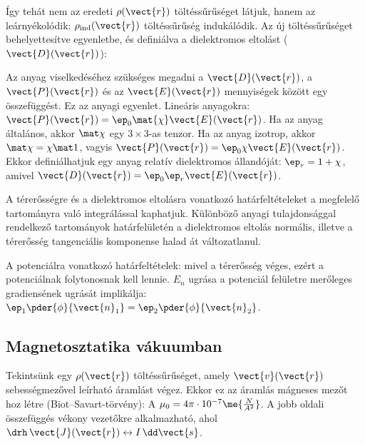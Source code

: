    Így tehát nem az eredeti $\rho(\vect{r})$ töltéssűrűséget látjuk, hanem az leárnyékolódik: 
   $\rho_\text{ind}(\vect{r})$ töltéssűrűség indukálódik. 
   Az új töltéssűrűséget behelyettesítve  egyenletbe, és definiálva a dielektromos eltolást ($\vect{D}(\vect{r})$):
   
   Az anyag viselkedéséhez szükséges megadni a $\vect{D}(\vect{r})$, a $\vect{P}(\vect{r})$ és az $\vect{E}(\vect{r})$ mennyiségek között egy összefüggést.
   Ez az anyagi egyenlet.
   Lineáris anyagokra: $\vect{P}(\vect{r})=\ep_0\mat{\chi}\vect{E}(\vect{r})$.
   Ha az anyag általános, akkor $\mat\chi$ egy $3\times 3$-as tenzor.
   Ha az anyag izotrop, akkor $\mat\chi=\chi\mat 1$, vagyis $\vect{P}(\vect{r})=\ep_0\chi\vect{E}(\vect{r})$.
   Ekkor definiálhatjuk egy anyag relatív dielektromos állandóját: $\ep_r=1+\chi$, amivel $\vect{D}(\vect{r})=\ep_0\ep_r\vect{E}(\vect{r})$. 
   
   A térerősségre és a dielektromos eltolásra vonatkozó határfeltételeket a megfelelő tartományra való integrálással kaphatjuk.
   Különböző anyagi tulajdonsággal rendelkező tartományok határfelületén a dielektromos eltolás normális, illetve a térerősség tangenciális komponense halad át változatlanul. 
   
   A potenciálra vonatkozó határfeltételek: mivel a térerősség véges, ezért a potenciálnak folytonosnak kell lennie. $E_n$ ugrása a potenciál felületre merőleges gradiensének ugrását implikálja: $\ep_1\pder{\phi}{\vect{n}_1}=\ep_2\pder{\phi}{\vect{n}_2}$. 
   
  \subsection{Magnetosztatika vákuumban}
   
   Tekintsünk egy $\rho(\vect{r})$ töltéssűrűséget, amely $\vect{v}(\vect{r})$ sebességmezővel leírható áramlást végez.
   Ekkor ez az áramlás mágneses mezőt hoz létre (Biot--Savart-törvény):
   A $\mu_0=4\pi\cdot 10^{-7}\me{\frac{N}{A^2}}$.
   A jobb oldali összefüggés vékony vezetőkre alkalmazható, ahol $\drh\,\vect{J}(\vect{r})\leftrightarrow I\,\dd \vect{s}$.
   
